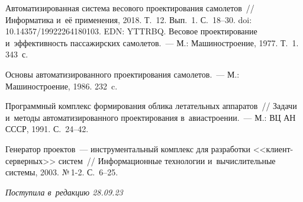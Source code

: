 \begin{multicols}{2}
{\small\frenchspacing
 { %
 \begin{thebibliography}{9}
 Автоматизированная 
система весового проектирования самолетов~// Информатика и~её применения, 
2018. Т.~12. Вып.~1. С.~18--30. doi: 10.14357/19922264180103. EDN: YTTRBQ.
 Весовое проектирование 
и~эф\-фек\-тив\-ность пассажирских самолетов.~---  М.: Машиностроение, 1977. 
Т.~1. 343~с.

 Осно\-вы 
автоматизированного проектирования самолетов.~--- М.: Машиностроение, 
1986. 232~c.

 Программный 
комплекс формирования облика летательных аппаратов~// Задачи и~методы 
автоматизированного проектирования в~авиа\-стро\-ении.~--- М.: ВЦ АН СССР, 
1991. С.~24--42.

 Генератор проектов~--- инструментальный комплекс для 
разработки <<кли\-ент-сер\-вер\-ных>> сис\-тем~// Информационные 
технологии и~вы\-чис\-ли\-тель\-ные сис\-те\-мы, 2003. №\,1-2. С.~6--25.
\end{thebibliography}

 }
 }

\end{multicols}

\vspace*{-6pt}

\hfill{\small\textit{Поступила в~редакцию 28.09.23}}



\newpage

\vspace*{-28pt}






\def\tit{SYNTHESIS MODELS OF~LAYOUT SCHEME IN~THE~TASK~OF~FORMING 
AN~AIRCRAFT~IMAGE}


\def\titkol{Synthesis models of layout scheme in~the~task of~forming 
an~aircraft image}


